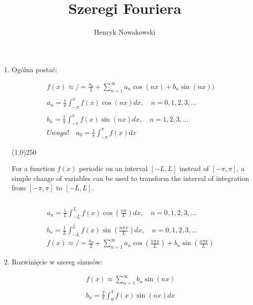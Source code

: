 \documentclass[11pt]{article}
\begin{document}
\author{Henryk Nowakowski}
\title{Szeregi Fouriera}
\maketitle




\begin{enumerate}

\item %

Ogólna postać:


\begin{align*}
f(x) \approx / = \frac{a_{0}}{2}+\sum_{n=1}^{\infty} a_{n}\cos(nx) + b_{n}\sin(nx))\\ \\
a_{n}= \frac{1}{\pi}\int_{-\pi}^{\pi} f(x) \cos(nx) dx,\quad n=0,1,2,3,... \\
\\ b_{n}= \frac{1}{\pi}\int_{-\pi}^{\pi} f(x) \sin(nx) dx, \quad n=1,2,3,... \\
Uwaga! \quad a_{0} = \frac{1}{\pi} \int_{-\pi}^{\pi} f(x) dx
\end{align*}


\line(1,0){250}

 For a function $f(x)$ periodic on an interval $[-L,L]$ instead of  $[-\pi,\pi]$, a simple change of variables can be used to transform the interval of integration from $[-\pi,\pi]$ to $[-L,L]$.

\begin{align*}
\\  \\
a_{n}= \frac{1}{L}\int_{-L}^{L} f(x) \cos(\frac{n\pi}{L}) dx,\quad
n=0,1,2,3,... \\ \\ b_{n}= \frac{1}{L}\int_{-L}^{L} f(x) \sin(\frac{n\pi x}{L}) dx,\quad
n=0,1,2,3,... \\
f(x) \approx / = \frac{a_{0}}{2}+\sum_{n=1}^{\infty} a_{n}\cos(\frac{n \pi x}{L}) + b_{n}\sin(\frac{n \pi x}{L})
\end{align*}


\item %
Rozwinięcie w szereg sinusów:

\begin{align*}
    f(x) \approx \sum_{n=1}^{\infty} b_{n} \sin(nx) \\ \\
    b_{n} = \frac{2}{\pi} \int_{0}^{\pi} f(x)\sin(nx) dx
\end{align*}


\end{enumerate}
\end{document}
